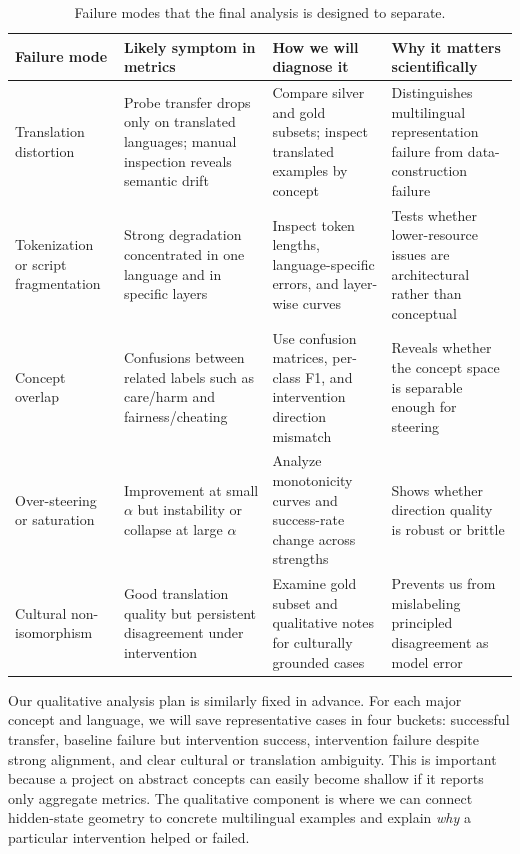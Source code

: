 \documentclass[11pt]{article}
\begin{document}
\begin{table}[t]
\centering
\small
\begin{tabular}{p{}p{}p{}p{}}
\toprule
\textbf{Failure mode} & \textbf{Likely symptom in metrics} & \textbf{How we will diagnose it} & \textbf{Why it matters scientifically} \\
\midrule
Translation distortion & Probe transfer drops only on translated languages; manual inspection reveals semantic drift & Compare silver and gold subsets; inspect translated examples by concept & Distinguishes multilingual representation failure from data-construction failure \\
Tokenization or script fragmentation & Strong degradation concentrated in one language and in specific layers & Inspect token lengths, language-specific errors, and layer-wise curves & Tests whether lower-resource issues are architectural rather than conceptual \\
Concept overlap & Confusions between related labels such as care/harm and fairness/cheating & Use confusion matrices, per-class F1, and intervention direction mismatch & Reveals whether the concept space is separable enough for steering \\
Over-steering or saturation & Improvement at small $\alpha$ but instability or collapse at large $\alpha$ & Analyze monotonicity curves and success-rate change across strengths & Shows whether direction quality is robust or brittle \\
Cultural non-isomorphism & Good translation quality but persistent disagreement under intervention & Examine gold subset and qualitative notes for culturally grounded cases & Prevents us from mislabeling principled disagreement as model error \\
\bottomrule
\end{tabular}
\caption{Failure modes that the final analysis is designed to separate.}
\label{tab:failures}
\end{table}

Our qualitative analysis plan is similarly fixed in advance. For each major concept and language, we will save representative cases in four buckets: successful transfer, baseline failure but intervention success, intervention failure despite strong alignment, and clear cultural or translation ambiguity. This is important because a project on abstract concepts can easily become shallow if it reports only aggregate metrics. The qualitative component is where we can connect hidden-state geometry to concrete multilingual examples and explain \emph{why} a particular intervention helped or failed.
\end{document}
